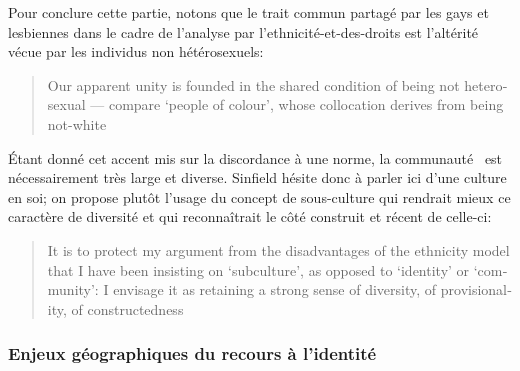Pour conclure cette partie, notons que le trait commun partagé par les gays et lesbiennes dans le cadre de l'analyse par l'ethnicité-et-des-droits est l'altérité vécue par les individus non hétérosexuels: \foreignblockquote{english}[{\cite[289]{Sinfield1996}}][.]{Our apparent unity is founded in the shared condition of being not heterosexual --- compare `people of colour', whose collocation derives from being not-white}.
Étant donné cet accent mis sur la discordance à une norme, la communauté \lgbt\ est nécessairement très large et diverse.
Sinfield hésite donc à parler ici d'une culture en soi; on propose plutôt l'usage du concept de sous-culture qui rendrait mieux ce caractère de diversité et qui reconnaîtrait le côté construit et récent de celle-ci:
\foreignblockquote{english}[{\cite[289]{Sinfield1996}}][.]{It is to protect my argument from the disadvantages of the ethnicity model that I have been insisting on `subculture', as opposed to `identity' or `community': I envisage it as retaining a strong sense of diversity, of provisionality, of constructedness}.



\subsubsection{Enjeux géographiques du recours à l'identité}
\label{sec:enjeux_g_ographiques_du_recours_l_identit_}

